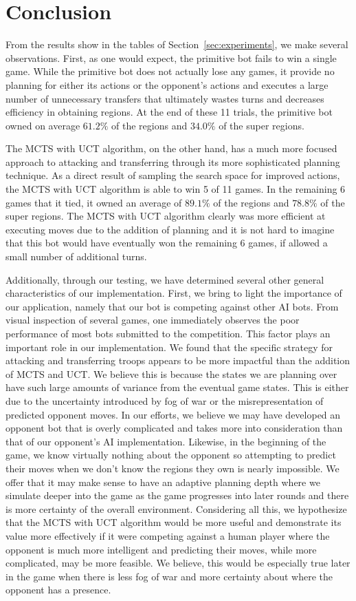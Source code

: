 \documentclass[a4paper,11pt]{article}
\begin{document}
\section{Conclusion}\label{sec:conclusion}
From the results show in the tables of Section~\ref{sec:experiments}, we make several observations. 
First, as one would expect, the primitive bot fails to win a single game.  While the primitive bot
does not actually lose any games, it provide no planning for either its actions or the opponent's 
actions and executes a large number of unnecessary transfers that ultimately wastes turns and 
decreases efficiency in obtaining regions. At the end of these 11 trials, the primitive bot owned
on average $61.2\%$ of the regions and $34.0\%$ of the super regions.

The MCTS with UCT algorithm, on the other hand, has a much more focused approach to attacking and 
transferring through its more sophisticated planning technique. As a direct result of sampling the 
search space for improved actions, the MCTS with UCT algorithm is able to win 5 of 11 games.  In the
remaining 6 games that it tied, it owned an average of $89.1\%$ of the regions and $78.8\%$ of the 
super regions. The MCTS with UCT algorithm clearly was more efficient at executing moves due to the 
addition of planning and it is not hard to imagine that this bot would have eventually won the 
remaining 6 games, if allowed a small number of additional turns.

Additionally, through our testing, we have determined several other general characteristics of our 
implementation.  First, we bring to light the importance of our application, namely that our bot 
is competing against other AI bots. From visual inspection of several games, one immediately observes 
the poor performance of most bots submitted to the competition. This factor plays an important role
in our implementation.  We found that the specific strategy for attacking and transferring troops
appears to be more impactful than the addition of MCTS and UCT.  We believe this is because the states 
we are planning over have such large amounts of variance from the eventual game states.  This is 
either due to the uncertainty introduced by fog of war or the misrepresentation of predicted opponent
moves. In our efforts, we believe we may have developed an opponent bot that is overly complicated
and takes more into consideration than that of our opponent's AI implementation. Likewise, in the
beginning of the game, we know virtually nothing about the opponent so attempting to predict their
moves when we don't know the regions they own is nearly impossible. We offer that it may make sense
to have an adaptive planning depth where we simulate deeper into the game as the game progresses into
later rounds and there is more certainty of the overall environment.  Considering all this, we 
hypothesize that the MCTS with UCT algorithm would be more useful and demonstrate its value more 
effectively if it were competing against a human player where the opponent is much more intelligent 
and predicting their moves, while more complicated, may be more feasible.  We believe, this would be 
especially true later in the game when there is less fog of war and more certainty about where the 
opponent has a presence.
\end{document}
